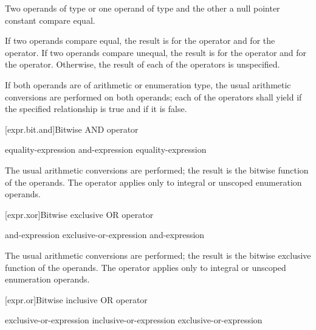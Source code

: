 \pnum
Two operands of type  or one operand of type
 and the other a null pointer constant compare equal.

\pnum
If two operands compare equal, the result is  for
the \tcode{==} operator and  for the \tcode{!=} operator. If two operands
compare unequal, the result is  for the \tcode{==} operator and
 for the \tcode{!=} operator. Otherwise, the result of each of the
operators is unspecified.

\pnum
If both operands are of arithmetic or enumeration type, the usual arithmetic
conversions are performed on both operands; each of the operators shall yield
 if the specified relationship is true and  if it is
false.

[expr.bit.and]{Bitwise AND operator}%
%
%
%
%

\begin{bnf}
\br
    equality-expression\br
    and-expression \terminal{\&} equality-expression
\end{bnf}

\pnum
The usual arithmetic conversions are performed; the result is the
bitwise  function of the operands. The operator
applies only to integral or unscoped enumeration operands.

[expr.xor]{Bitwise exclusive OR operator}%
%
%

\begin{bnf}
\br
    and-expression\br
    exclusive-or-expression \terminal{\^{}} and-expression
\end{bnf}

\pnum
The usual arithmetic conversions are performed; the result is the
bitwise exclusive  function of the operands. The
operator applies only to integral or unscoped enumeration operands.

[expr.or]{Bitwise inclusive OR operator}%
%
%

\begin{bnf}
\br
    exclusive-or-expression\br
    inclusive-or-expression \terminal{|} exclusive-or-expression
\end{bnf}

